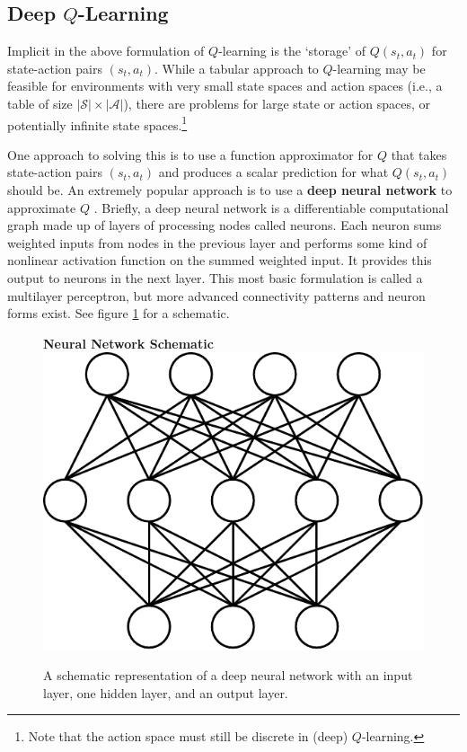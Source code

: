 \documentclass[journal, onecolumn, 12pt, draftclsnofoot]{IEEEtran}
\newcommand{\kword}[1]{\textbf{#1}}
\newcommand{\mc}[1]{\mathcal{#1}}
\begin{document}
		\subsection{Deep $Q$-Learning}
		\par Implicit in the above formulation of $Q$-learning is the `storage' of $Q(s_t,a_t)$ for state-action pairs $(s_t,a_t)$. While a tabular approach to $Q$-learning may be feasible for environments with very small state spaces and action spaces (i.e., a table of size $\lvert \mc{S} \rvert \times \lvert \mc{A} \rvert $), there are problems for large state or action spaces, or potentially infinite state spaces.\footnote{Note that the action space must still be discrete in (deep) $Q$-learning.}
		\par One approach to solving this is to use a function approximator for $Q$ that takes state-action pairs $(s_t,a_t)$ and produces a scalar prediction for what $Q(s_t,a_t)$ should be. An extremely popular approach is to use a \kword{deep neural network} to approximate $Q$ \cite{dqn}. Briefly, a deep neural network is a differentiable computational graph made up of layers of processing nodes called neurons. Each neuron sums weighted inputs from nodes in the previous layer and performs some kind of nonlinear activation function on the summed weighted input. It provides this output to neurons in the next layer. This most basic formulation is called a multilayer perceptron, but more advanced connectivity patterns and neuron forms exist. See figure \ref{fig:nn-blank} for a schematic.
		\begin{figure}[ht]
			\begin{center}
				\textbf{Neural Network Schematic}\\
			\includegraphics[scale=0.75]{fig/nn-blank.pdf}
			\end{center}
			\caption{A schematic representation of a deep neural network with an input layer, one hidden layer, and an output layer.}
			\label{fig:nn-blank}
		\end{figure}
\end{document}
